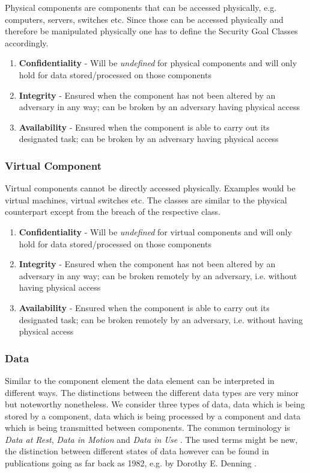 Physical components are components that can be accessed physically, e.g. computers, servers, switches etc. Since those can be accessed physically and therefore be manipulated physically one has to define the Security Goal Classes accordingly.

\begin{enumerate}
\item \textbf{Confidentiality} - Will be \textit{undefined} for physical components and will only hold for data stored/processed on those components
\item \textbf{Integrity} - Ensured when the component has not been altered by an adversary in any way; can be broken by an adversary having physical access
\item \textbf{Availability} - Ensured when the component is able to carry out its designated task; can be broken by an adversary having physical access
\end{enumerate}

\subsubsection*{Virtual Component}

Virtual components cannot be directly accessed physically. Examples would be virtual machines, virtual switches etc. The classes are similar to the physical counterpart except from the breach of the respective class.

\begin{enumerate}
\item \textbf{Confidentiality} - Will be \textit{undefined} for virtual components and will only hold for data stored/processed on those components
\item \textbf{Integrity} - Ensured when the component has not been altered by an adversary in any way; can be broken remotely by an adversary, i.e. without having physical access
\item \textbf{Availability} - Ensured when the component is able to carry out its designated task; can be broken remotely by an adversary, i.e. without having physical access
\end{enumerate}

\subsubsection{Data}

Similar to the component element the data element can be interpreted in different ways.
The distinctions between the different data types are very minor but noteworthy nonetheless. We consider three types of data, data which is being stored by a component, data which is being processed by a component and data which is being transmitted between components. The common terminology is \textit{Data at Rest}, \textit{Data in Motion} and \textit{Data in Use} \cite{kanagasingham2008data}. The used terms might be new, the distinction between different states of data however can be found in publications going as far back as 1982, e.g. by Dorothy E. Denning \cite{robling1982cryptography}.

